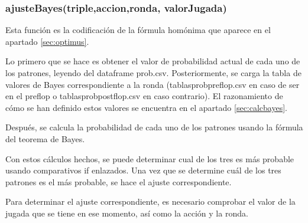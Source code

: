 \subsubsection{ajusteBayes(triple,accion,ronda, valorJugada)}

Esta función es la codificación de la fórmula homónima que aparece en el apartado  \ref{sec:optimus}.

Lo primero que se hace es obtener el valor de probabilidad actual de cada uno de los patrones, leyendo del dataframe prob.csv. Posteriormente, se carga la tabla de valores de Bayes correspondiente a la ronda (tablasprobpreflop.csv en caso de ser en el preflop o tablasprobpostflop.csv en caso contrario). El razonamiento de cómo se han definido estos valores se encuentra en el apartado \ref{sec:calcbayes}.

Después, se calcula la probabilidad de cada uno de los patrones usando la fórmula del teorema de Bayes. 

Con estos cálculos hechos, se puede determinar cual de los tres es más probable usando comparativos if enlazados. Una vez que se determine cuál de los tres patrones es el más probable, se hace el ajuste correspondiente.

Para determinar el ajuste correspondiente, es necesario comprobar el valor de la jugada que se tiene en ese momento, así como la acción y la ronda.

